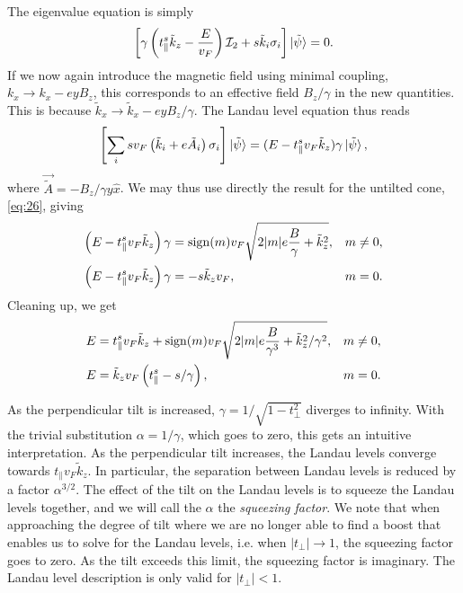 The eigenvalue equation is simply
\begin{equation}
  \label{eq:42}
  \left[  \gamma \left( t^s_{\parallel} \tilde{k}_{z} - \frac{E}{v_{F}} \right) \mathcal{I}_{2} +
  s \tilde{k}_{i} \sigma _{i} \right] \ket{\tilde{\psi}}= 0.
\end{equation}
If we now again introduce the magnetic field using minimal coupling, \(k_{x} \to  k_{x} - ey B_{z} \), this corresponds to an effective field \(B_{z} /\gamma \) in the new quantities.
This is because \(\tilde{k}_{x} \to  \tilde{k}_{x} - e y B_{z} /\gamma \).
The Landau level equation thus reads
\begin{equation}
  \label{eq:43}
  \left[
  \sum\limits_{i} s v_{F} \left(\tilde{k}_{i} + e \tilde{A}_{i} \right) \sigma _{i}
\right  ] \ket{\tilde{\psi}} =
(E- t^s_{\parallel} v_{F} \tilde{k}_{z}) \gamma \ket{\tilde{\psi}},
\end{equation}
where \(\vec{\tilde{A}}=-B_{z}/ \gamma y \hat{x}\).
We may thus use directly the result for the untilted cone, \cref{eq:26}, giving
\begin{subequations}
  \label{eq:44}
  \begin{align}
    \left(E - t^s_{\parallel} v_{F} \tilde{k}_{z} \right) \gamma &= \operatorname{sign} (m) v_{F} \sqrt{2 |m| e \frac{B}{ \gamma }  + \tilde{k}_{z}^2}, & m \neq 0,\\
    \left(E - t^s_{\parallel} v_{F} \tilde{k}_{z} \right) \gamma &= - s   \tilde{k}_{z} v_{F}, & m=0.
  \end{align}
\end{subequations}
Cleaning up, we get
\begin{subequations}
  \label{eq:45}
  \begin{align}
    E &= t^s_{\parallel} v_F \tilde{k}_{z} + \operatorname{sign}(m) v_F \sqrt{2 |m| e \frac{B}{\gamma ^3}  + \tilde{k}_{z}^2 /\gamma ^2}, & m\neq 0,\\
    E &= \tilde{k}_{z} v_{F} \left( t^s_{\parallel}  - s  / \gamma  \right), & m=0.
  \end{align}
\end{subequations}

As the perpendicular tilt is increased, \(\gamma = 1 / \sqrt{1-t_{\perp} ^{2}}\) diverges to infinity.
With the trivial substitution \(\alpha = 1 /\gamma \), which goes to zero, this gets an intuitive interpretation.
As the perpendicular tilt increases, the Landau levels converge towards \(t_{\parallel} v_{F} \tilde{k}_{z}\).
In particular, the separation between Landau levels is reduced by a factor \(\alpha ^{3 /2}\).
The effect of the tilt on the Landau levels is to squeeze the Landau levels together, and we will call the \(\alpha \) the \emph{squeezing factor}.
We note that when approaching the degree of tilt where we are no longer able to find a boost that enables us to solve for the Landau levels, i.e. when \( |t_{\perp}| \to 1\), the squeezing factor goes to zero.
As the tilt exceeds this limit, the squeezing factor is imaginary.
The Landau level description is only valid for \( |t_{\perp}| < 1 \).

